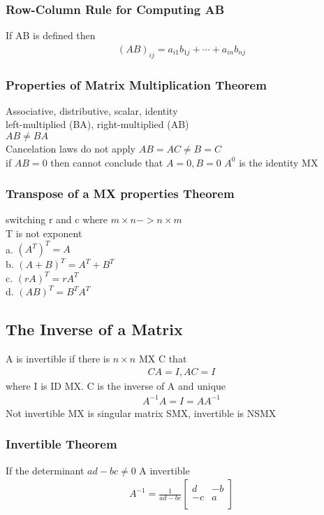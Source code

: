 \documentclass[12pt]{article}
\begin{document}
    \subsubsection{Row-Column Rule for Computing AB}
        If AB is defined then 
        \begin{align*}
            (AB)_{ij} = a_{i1}b_{1j} + \cdots + a_{in}b_{nj}
        \end{align*}
    \subsubsection{Properties of Matrix Multiplication Theorem}
        Associative, distributive, scalar, identity \\
        left-multiplied (BA), right-multiplied (AB) \\
        $ AB \ne BA $ \\
        Cancelation laws do not apply $ AB = AC \ne B = C $ \\
        if $ AB = 0 $ then cannot conclude that $ A = 0, B = 0 $ 
        $ A^0 $  is the identity MX 
    \subsubsection{Transpose of a MX properties Theorem}
        switching r and c where $ m \times n -> n \times m $ \\
        T is not exponent \\
        a. $ (A^{T})^{T} = A$ \\
        b. $ (A + B)^{T} = A^{T} + B^{T} $ \\
        c. $ (rA)^{T} = rA^{T} $ \\
        d. $ (AB)^{T} = B^{T}A^{T} $ 
\subsection{The Inverse of a Matrix}
    A is invertible if there is $ n \times n $  MX C that
    \begin{align*}
        CA = I, AC = I
    \end{align*}
    where I is ID MX. C is the inverse of A and unique
    \begin{align*}
        A^{-1}A = I = AA^{-1}
    \end{align*}
    Not invertible MX is singular matrix SMX, invertible is NSMX 
    \subsubsection{Invertible Theorem} 
        If the determinant $ ad - bc \ne 0 $ A invertible
        \begin{align*}
            A^{-1} = \frac{1}{ad-bc} \begin{bmatrix}
            d&-b\\
            -c&a\\
            \end{bmatrix}
        \end{align*}
\end{document}

